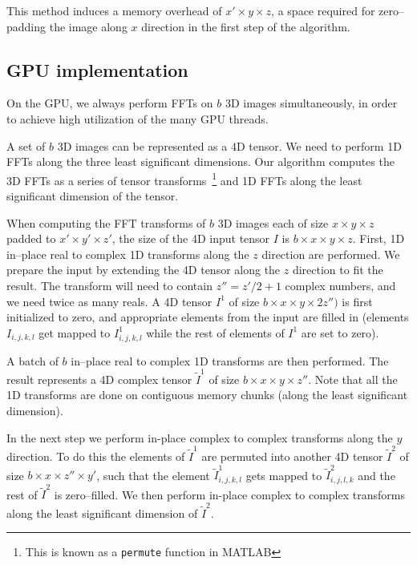 \documentclass[conference]{./IEEEtran/IEEEtran}
\begin{document}
  This method induces a memory overhead of $x' \times y \times z$, a
  space required for zero--padding the image along $x$ direction in
  the first step of the algorithm.


  \subsection{GPU implementation}

  \label{sec:gpu-fft-impl}

  On the GPU, we always perform FFTs on $b$ 3D images simultaneously,
  in order to achieve high utilization of the many GPU threads.

  A set of $b$ 3D images can be represented as a 4D tensor.  We need
  to perform 1D FFTs along the three least significant dimensions.
  Our algorithm computes the 3D FFTs as a series of tensor
  transforms~\footnote{This is known as a \texttt{permute} function in
    MATLAB} and 1D FFTs along the least significant dimension of the
  tensor.

  When computing the FFT transforms of $b$ 3D images each of size $x
  \times y \times z$ padded to $x' \times y' \times z'$, the size of
  the 4D input tensor $I$ is $b \times x \times y \times z$.  First,
  1D in--place real to complex 1D transforms along the $z$ direction
  are performed.  We prepare the input by extending the 4D tensor
  along the $z$ direction to fit the result.  The transform will need
  to contain $z'' = z' / 2 + 1$ complex numbers, and we need twice as
  many reals.  A 4D tensor $I^1$ of size $b \times x \times y \times
  2z'')$ is first initialized to zero, and appropriate elements from
  the input are filled in (elements $I_{i,j,k,l}$ get mapped to
  $I^1_{i,j,k,l}$ while the rest of elements of $I^1$ are set to
  zero).

  A batch of $b$ in--place real to complex 1D transforms are then
  performed.  The result represents a 4D complex tensor
  $\widetilde{I}^1$ of size $b \times x \times y \times z''$.  Note
  that all the 1D transforms are done on contiguous memory chunks
  (along the least significant dimension).

  In the next step we perform in-place complex to complex transforms
  along the $y$ direction.  To do this the elements of
  $\widetilde{I}^1$ are permuted into another 4D tensor
  $\widetilde{I}^2$ of size $b \times x \times z'' \times y'$, such
  that the element $\widetilde{I}^1_{i,j,k,l}$ gets mapped to
  $\widetilde{I}^2_{i,j,l,k}$ and the rest of $\widetilde{I}^2$ is
  zero--filled.  We then perform in-place complex to complex
  transforms along the least significant dimension of
  $\widetilde{I}^2$.
\end{document}
